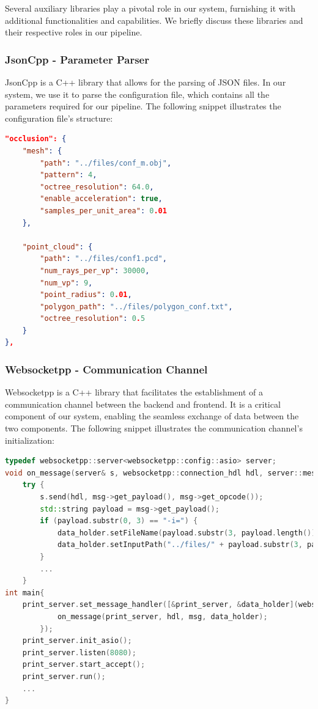 \documentclass[11pt, a4paper,oneside,chapterprefix=false]{scrbook}
\begin{document}
Several auxiliary libraries play a pivotal role in our system, furnishing it with additional functionalities and capabilities. We briefly discuss these libraries and their respective roles in our pipeline.

\subsubsection{JsonCpp - Parameter Parser} \label{subsec:jsoncpp}

JsonCpp is a C++ library that allows for the parsing of JSON files. In our system, we use it to parse the configuration file, which contains all the parameters required for our pipeline. The following snippet illustrates the configuration file's structure:

\begin{lstlisting}[language=json, caption=Json Configuration File]
"occlusion": {
	"mesh": {
		"path": "../files/conf_m.obj",
		"pattern": 4,
		"octree_resolution": 64.0,
		"enable_acceleration": true,
		"samples_per_unit_area": 0.01
	},

	"point_cloud": {
		"path": "../files/conf1.pcd",
		"num_rays_per_vp": 30000, 
		"num_vp": 9, 
		"point_radius": 0.01,
		"polygon_path": "../files/polygon_conf.txt",
		"octree_resolution": 0.5
	}
},
\end{lstlisting}

\subsubsection{Websocketpp - Communication Channel} \label{subsec:websocketpp}

Websocketpp is a C++ library that facilitates the establishment of a communication channel between the backend and frontend. It is a critical component of our system, enabling the seamless exchange of data between the two components. The following snippet illustrates the communication channel's initialization:

\begin{lstlisting}[language=C++, caption=Websocket Server]
typedef websocketpp::server<websocketpp::config::asio> server;
void on_message(server& s, websocketpp::connection_hdl hdl, server::message_ptr msg, DataHolder& data_holder) {
	try {
		s.send(hdl, msg->get_payload(), msg->get_opcode());
		std::string payload = msg->get_payload();
		if (payload.substr(0, 3) == "-i=") {
			data_holder.setFileName(payload.substr(3, payload.length()));
			data_holder.setInputPath("../files/" + payload.substr(3, payload.length()));
		}
		...
	}
int main{
	print_server.set_message_handler([&print_server, &data_holder](websocketpp::connection_hdl hdl, server::message_ptr msg) {
            on_message(print_server, hdl, msg, data_holder);
        });
	print_server.init_asio();
	print_server.listen(8080);
	print_server.start_accept();
	print_server.run();
	...	
}
\end{lstlisting}
\end{document}
